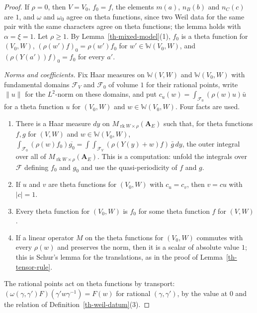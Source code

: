 \begin{proof}
If $\rho=0$, then $V=V_0$, $f_0=f$, the elements $m(a)$, $n_B(b)$ and
$n_C(c)$ are $1$, and $\omega$ and $\omega_0$ agree on theta functions, since
two Weil data for the same pair with the same characters agree on theta
functions; the lemma holds with $\alpha=\xi=1$. Let $\rho\geq1$. By
Lemma~\ref{th-mixed-model}(1), $f_0$ is a theta function for $(V_0,W)$,
$(\rho(w')f)_0=\rho(w')f_0$ for $w'\in\mathbb W(V_0,W)$, and
$(\rho(Y(a'))f)_0=f_0$ for every $a'$.

\emph{Norms and coefficients.} Fix Haar measures on $\mathbb W(V,W)$ and
$\mathbb W(V_0,W)$ with fundamental domains $\mathcal F_V$ and $\mathcal F_0$
of volume $1$ for their rational points, write $\|u\|$ for the $L^2$-norm on
these domains, and put $c_u(w)=\int_{\mathcal F_0}(\rho(w)u)\bar u$ for a theta
function $u$ for $(V_0,W)$ and $w\in\mathbb W(V_0,W)$. Four facts are used.
\begin{enumerate}
\item[(C1)] There is a Haar measure $dy$ on
  $M_{\operatorname{rk}W\times\rho}(\mathbf A_E)$ such that, for theta
  functions $f,g$ for $(V,W)$ and $w\in\mathbb W(V_0,W)$,
  $\int_{\mathcal F_0}(\rho(w)f_0)\overline{g_0}
  =\int\int_{\mathcal F_V}(\rho(Y(y)+w)f)\,\bar g\,dy$, the outer integral over
  all of $M_{\operatorname{rk}W\times\rho}(\mathbf A_E)$. This is a computation:
  unfold the integrals over $\mathcal F$ defining $f_0$ and $g_0$ and use the
  quasi-periodicity of $f$ and $g$.
\item[(C2)] If $u$ and $v$ are theta functions for $(V_0,W)$ with $c_u=c_v$,
  then $v=cu$ with $|c|=1$.
\item[(C3)] Every theta function for $(V_0,W)$ is $f_0$ for some theta function
  $f$ for $(V,W)$.
\item[(C4)] If a linear operator $M$ on the theta functions for $(V_0,W)$
  commutes with every $\rho(w)$ and preserves the norm, then it is a scalar of
  absolute value $1$; this is Schur's lemma for the translations, as in the
  proof of Lemma~\ref{th-tensor-rule}.
\end{enumerate}
The rational points act on theta functions by transport:
$(\omega(\gamma,\gamma')F)(\gamma'w\gamma^{-1})=F(w)$ for rational
$(\gamma,\gamma')$, by the value at $0$ and the relation of
Definition~\ref{th-weil-datum}(3).


\end{proof}
